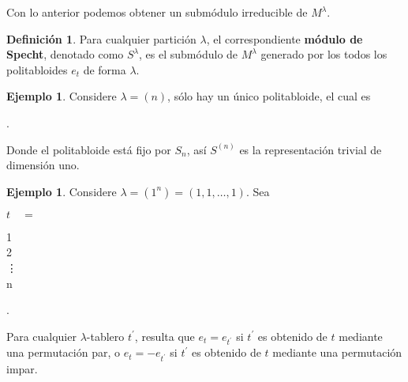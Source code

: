\documentclass[12pt]{book}
\theoremstyle{definition}
\newtheorem{definition}[theorem]{Definición}
\newtheorem{example}[theorem]{Ejemplo}
\newcounter{in}
\newcounter{ini}
\begin{document}
Con lo anterior podemos obtener un submódulo irreducible de $M^{\lambda}$.
\begin{definition}
  Para cualquier partición $\lambda$, el correspondiente
  \textbf{módulo de Specht}, denotado como $S^{\lambda}$, es el submódulo
  de $M^{\lambda}$ generado por los todos los politabloides $e_{t}$ de
  forma $\lambda$.
\end{definition}
\begin{example}
  \label{n}
  Considere $\lambda=(n)$, sólo hay un único politabloide, el cual es
  \begin{center}
     \quad .
  \end{center}
Donde el politabloide está fijo por $S_{n}$, así $S^{(n)}$ es la
representación trivial de dimensión uno. 
\end{example}

\begin{example}
  \label{1n} 
  Considere $\lambda=(1^{n})=(1,1,\ldots,1)$. Sea
  
  \begin{center}
    \begin{minipage}[h]{0.1\linewidth}
      $t\quad=$
    \end{minipage}
    \begin{minipage}[h]{0.05\linewidth}
      \begin{ytableau}
        1\\
        2\\
        \vdots\\
        n
      \end{ytableau} 
    \end{minipage}.
  \end{center}

  Para cualquier $\lambda$-tablero $t^{'}$,
  resulta que $e_{t}=e_{t^{'}}$ si $t^{'}$ es obtenido de $t$ mediante una
  permutación par, o $e_{t}=-e_{t^{'}}$ si $t^{'}$ es obtenido de $t$
  mediante una permutación impar.
\end{example}
\end{document}

